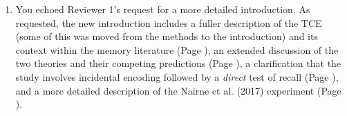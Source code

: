 \documentclass[12pt]{article}
\begin{document}
\begin{enumerate}

\item
	You echoed Reviewer 1's request for a more detailed introduction. As requested, the new introduction includes a fuller description of the TCE (some of this was moved from the methods to the introduction) and its context within the memory literature (Page \pageref{TODO-1}), %
	an extended discussion of the two theories and their competing predictions (Page \pageref{TODO-2}),
	a clarification that the study involves incidental encoding followed by a \emph{direct} test of recall (Page  \pageref{TODO-3}),
	and a more detailed description of the Nairne et al. (2017) experiment (Page \pageref{TODO-4}).


\end{enumerate}
\end{document}
